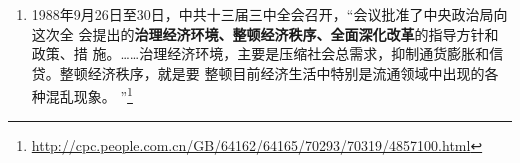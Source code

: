 \begin{enumerate}
\begin{quotation}
    新的经济运行机制，总体上来说应当是“\textbf{国家调节市场，市场引导企业}”的机制。
    国家运用经济手段、法律手段和必要的行政手段，调节市场供求关系，创造适宜的
    经济和社会环境，以此引导企业正确地进行经营决策。
  \end{quotation}

  据赵紫阳回忆，他作报告时，陈云中途退席。严立贤就此报告中的“\textbf{政府调控市场,市
    场引导企业}”写到
  \begin{quotation}
    在十二届三中全会，只是强调国家计划必须依据价值规律，而在这里，\textbf{国家计
      划必须通过市场来实现}，也即只能通过市场把企业引导到国家计划上来。这
    样，\textbf{指令性计划必然要退居次要位置}，整个经济体制因此向市场经济迈进了一
    大步。
    \footnote{\url{http://jds.cass.cn/ztyj/jjs/201605/t20160506_3324987.shtml}}
  \end{quotation}

  在马克思所作的科学共产主义重要纲领性文献《哥达纲领批判》中，将共产主义分为
  共产主义初级阶段（即社会主义）和共产主义高级阶段，初级阶段是向高级阶段的过
  渡期。“社会主义初级阶段”其实并不如报告中所说“已经进入社会主义社会”。它
  不是“共产主义初级阶段”——社会主义，而是相较社会主义阶段带有更多资产阶级
  法权的“前社会主义阶段”或“后资本主义阶段”。

  事实上，不管苏联或者中国如何左或如何宣称，都始终都未曾脱离国家资本主义为主
  体的范畴，列宁在战时共产主义失败后对此具有较为清醒认识。在社会主义国家阵营
  的实践中，马恩历史唯物主义中所说的“物质生活条件、生产关系和交换关系的发展
  程度”确实是无法跨越的卡夫丁峡谷。

  赵紫阳本次大会报告上提出\textbf{“一个中心”——以经济建设为中心，将坚持四项基本原
  则和坚持改革开放列为两个基本点。} 据赵紫阳《改革历程》记载，邓力群、胡乔木、
  王忍之等保守派在中共十三大之前对“一个中心，两个基本点”意见较大，他们认为
  应当坚持“四项基本原则为纲，改革开放为目”。此时自由派居保守派上风。


\item 1988年9月26日至30日，中共十三届三中全会召开，“会议批准了中央政治局向这次全
  会提出的\textbf{治理经济环境、整顿经济秩序、全面深化改革}的指导方针和政策、措
  施。……治理经济环境，主要是压缩社会总需求，抑制通货膨胀和信贷。整顿经济秩序，就是要
  整顿目前经济生活中特别是流通领域中出现的各种混乱现象。
  ”\footnote{\url{http://cpc.people.com.cn/GB/64162/64165/70293/70319/4857100.html}}


\end{enumerate}
